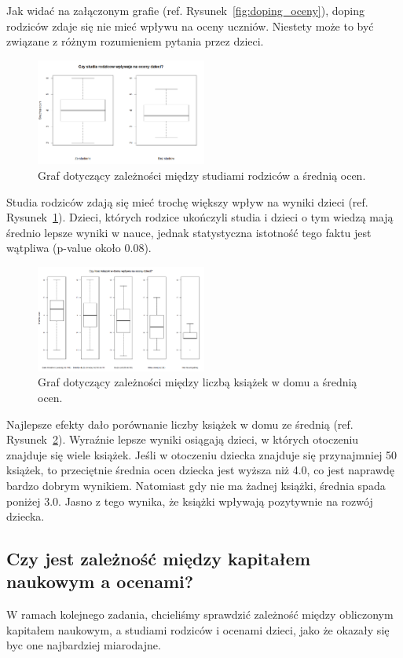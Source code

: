 \documentclass[conference]{IEEEtran}
\begin{document}
Jak widać na załączonym grafie (ref. Rysunek~\ref{fig:doping_oceny}), doping rodziców zdaje się nie mieć wpływu na oceny uczniów. Niestety może to być związane z różnym rozumieniem pytania przez dzieci.

\begin{figure}
	\centering
	\includegraphics[width=0.5\textwidth]{4.png}
	\caption{Graf dotyczący zależności między studiami rodziców a średnią ocen.}
	\label{fig:studia_oceny}
\end{figure}

Studia rodziców zdają się mieć trochę większy wpływ na wyniki dzieci (ref. Rysunek~\ref{fig:studia_oceny}). Dzieci, których rodzice ukończyli studia i dzieci o tym wiedzą mają średnio lepsze wyniki w nauce, jednak statystyczna istotność tego faktu jest wątpliwa (p-value około 0.08).

\begin{figure}
	\centering
	\includegraphics[width=0.5\textwidth]{5.png}
	\caption{Graf dotyczący zależności między liczbą książek w domu a średnią ocen.}
	\label{fig:ksiazki_oceny}
\end{figure}

Najlepsze efekty dało porównanie liczby książek w domu ze średnią (ref. Rysunek~\ref{fig:ksiazki_oceny}). Wyraźnie lepsze wyniki osiągają dzieci, w których otoczeniu znajduje się wiele książek. Jeśli w otoczeniu dziecka znajduje się przynajmniej 50 książek, to przeciętnie średnia ocen dziecka jest wyższa niż 4.0, co jest naprawdę bardzo dobrym wynikiem. Natomiast gdy nie ma żadnej książki, średnia spada poniżej 3.0. Jasno z tego wynika, że książki wpływają pozytywnie na rozwój dziecka.

\subsection{Czy jest zależność między kapitałem naukowym a ocenami?}
W ramach kolejnego zadania, chcieliśmy sprawdzić zależność między obliczonym kapitałem naukowym, a studiami rodziców i ocenami dzieci, jako że okazały się byc one najbardziej miarodajne.
\end{document}
